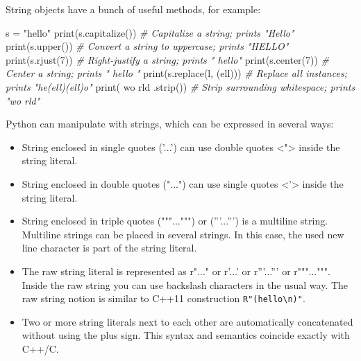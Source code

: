 \documentclass[
]{article}
\newenvironment{Shaded}{}{}
\newcommand{\BuiltInTok}[1]{#1}
\newcommand{\CommentTok}[1]{\textcolor[rgb]{0.38,0.63,0.69}{\textit{#1}}}
\newcommand{\DecValTok}[1]{\textcolor[rgb]{0.25,0.63,0.44}{#1}}
\newcommand{\NormalTok}[1]{#1}
\newcommand{\OperatorTok}[1]{\textcolor[rgb]{0.40,0.40,0.40}{#1}}
\newcommand{\StringTok}[1]{\textcolor[rgb]{0.25,0.44,0.63}{#1}}
\begin{document}
String objects have a bunch of useful methods, for example:

\begin{Shaded}
\begin{Highlighting}[]
\NormalTok{s }\OperatorTok{=} \StringTok{"hello"}
\BuiltInTok{print}\NormalTok{(s.capitalize())           }\CommentTok{\# Capitalize a string; prints "Hello"}
\BuiltInTok{print}\NormalTok{(s.upper())                }\CommentTok{\# Convert a string to uppercase; prints "HELLO"}
\BuiltInTok{print}\NormalTok{(s.rjust(}\DecValTok{7}\NormalTok{))               }\CommentTok{\# Right{-}justify a string; prints "  hello"}
\BuiltInTok{print}\NormalTok{(s.center(}\DecValTok{7}\NormalTok{))              }\CommentTok{\# Center a string; prints " hello "}
\BuiltInTok{print}\NormalTok{(s.replace(}\StringTok{\textquotesingle{}l\textquotesingle{}}\NormalTok{, }\StringTok{\textquotesingle{}(ell)\textquotesingle{}}\NormalTok{))  }\CommentTok{\# Replace all instances; prints "he(ell)(ell)o"}
\BuiltInTok{print}\NormalTok{(}\StringTok{\textquotesingle{}  wo rld \textquotesingle{}}\NormalTok{.strip())      }\CommentTok{\# Strip surrounding whitespace; prints "wo rld"}
\end{Highlighting}
\end{Shaded}

Python can manipulate with strings, which can be expressed in several
ways:

\begin{itemize}
\item
  String enclosed in single quotes ('...') can use double quotes
  \textless"\textgreater{} inside the string literal.
\item
  String enclosed in double quotes ("...") can use single quotes
  \textless'\textgreater{} inside the string literal.
\item
  String enclosed in triple quotes ("""...""") or ('''...''') is a
  multiline string. Multiline strings can be placed in several strings.
  In this case, the used new line character is part of the string
  literal.
\item
  The raw string literal is represented as r"..." or r'...' or
  r'''...''' or r"""...""". Inside the raw string you can use backslash
  characters in the usual way. The raw string notion is similar to C++11
  construction \texttt{R"(hello\textbackslash{}n)"}.
\item
  Two or more string literals next to each other are automatically
  concatenated without using the plus sign. This syntax and semantics
  coincide exactly with C++/C.
\end{itemize}
\end{document}
